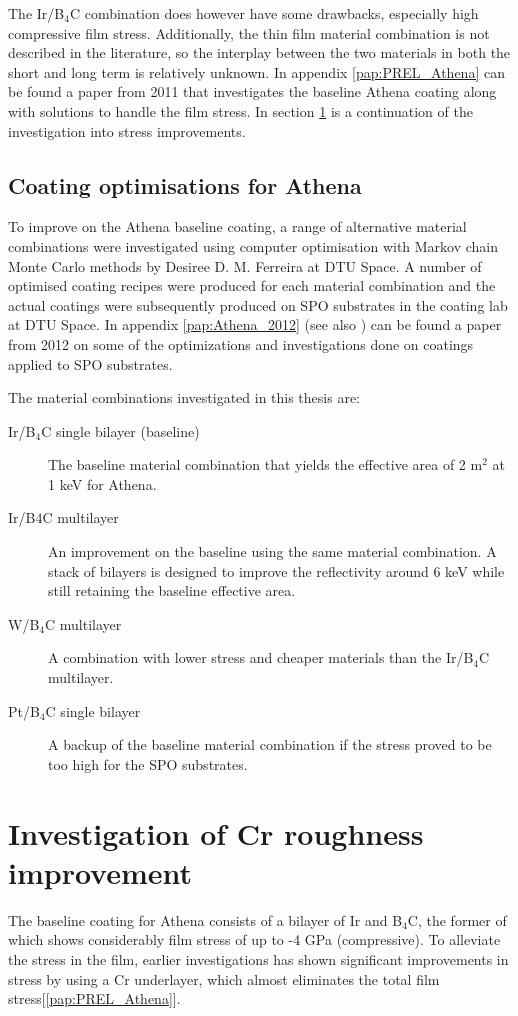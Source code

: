 The Ir/B$_4$C combination does however have some drawbacks, especially high compressive film stress. Additionally, the thin film material combination is not described in the literature, so the interplay between the two materials in both the short and long term is relatively unknown. In appendix \ref{pap:PREL_Athena} can be found a paper from 2011 that investigates the baseline Athena coating along with solutions to handle the film stress. In section \ref{sec:Athena_cr_impro} is a continuation of the investigation into stress improvements.

\subsection{Coating optimisations for Athena}
To improve on the Athena baseline coating, a range of alternative material combinations were investigated using computer optimisation with Markov chain Monte Carlo methods by Desiree D. M. Ferreira at DTU Space. A number of optimised coating recipes were produced for each material combination and the actual coatings were subsequently produced on SPO substrates in the coating lab at DTU Space. In appendix \ref{pap:Athena_2012} (see also \cite{ferreira2012Athena}) can be found a paper from 2012 on some of the optimizations and investigations done on coatings applied to SPO substrates.

The material combinations investigated in this thesis are:

\begin{description}
  \item[Ir/B$_4$C single bilayer (baseline)] The baseline material combination that yields the effective area of 2 m$^2$ at 1 keV for Athena.
  \item[Ir/B$4$C multilayer] An improvement on the baseline using the same material combination. A stack of bilayers is designed to improve the reflectivity around 6 keV while still retaining the baseline effective area.
  \item[W/B$_4$C multilayer] A combination with lower stress and cheaper materials than the Ir/B$_4$C multilayer.
  \item[Pt/B$_4$C single bilayer] A backup of the baseline material combination if the stress proved to be too high for the SPO substrates.
\end{description}

\section{Investigation of Cr roughness improvement}\label{sec:Athena_cr_impro}
The baseline coating for Athena consists of a bilayer of Ir and B$_4$C, the former of which shows considerably film stress of up to -4 GPa (compressive). To alleviate the stress in the film, earlier investigations has shown significant improvements in stress by using a Cr underlayer, which almost eliminates the total film stress[\ref{pap:PREL_Athena}].

